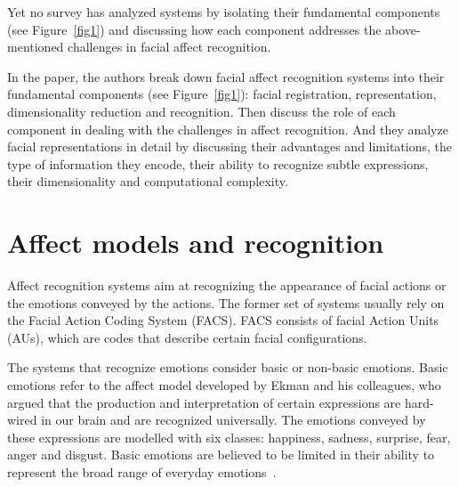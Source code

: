 \documentclass[10pt,twocolumn,letterpaper]{article}
\begin{document}
	\par
	Yet no survey has analyzed systems by isolating their fundamental components (see Figure~\ref{fig1}) and discussing how each component addresses the above-mentioned challenges in facial affect recognition.
	\par
	In the paper, the authors break down facial affect recognition systems into their fundamental components (see Figure~\ref{fig1}): facial registration, representation, dimensionality reduction and recognition. Then discuss the role of each component in dealing with the challenges in affect recognition. And they analyze facial representations in detail by discussing their advantages and limitations, the type of information they encode, their ability to recognize subtle expressions, their dimensionality and computational complexity. 
	\par
	\section*{Affect models and recognition}
	Affect recognition systems aim at recognizing the appearance of facial actions or the emotions conveyed by the actions. The former set of systems usually rely on the Facial Action Coding System (FACS). FACS consists of facial Action Units (AUs), which are codes that describe certain facial configurations.
	\par
	The systems that recognize emotions consider basic or non-basic emotions. Basic emotions refer to the affect model developed by Ekman and his colleagues, who argued that the production and interpretation of certain expressions are hard-wired in our brain and are recognized universally. The emotions conveyed by these expressions are modelled with six classes: happiness, sadness, surprise, fear, anger and disgust. Basic emotions are believed to be limited in their ability to represent the broad range of everyday emotions~\cite{Gunes2013Categorical}.
	{\small
		
		
	}
\end{document}
